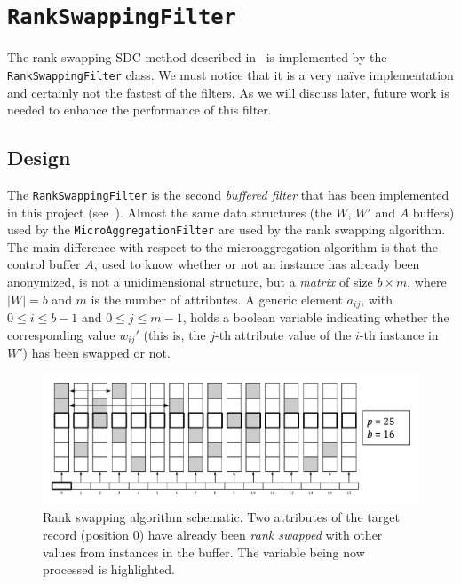 \section{\texttt{RankSwappingFilter}}
\label{Implementation:RankSwapping}

The rank swapping SDC method described in~ is implemented by the \texttt{RankSwappingFilter} class. We must notice that it is a very naïve implementation and certainly not the fastest of the filters. As we will discuss later, future work is needed to enhance the performance of this filter.

\subsection{Design}
\label{Implementation:RankSwapping:Design}

The \texttt{RankSwappingFilter} is the second \textit{buffered filter} that has been implemented in this project (see~). Almost the same data structures (the $W$, $W'$ and $A$ buffers) used by the \texttt{MicroAggregationFilter} are used by the rank swapping algorithm. The main difference with respect to the microaggregation algorithm is that the control buffer $A$, used to know whether or not an instance has already been anonymized, is not a unidimensional structure, but a \textit{matrix} of size $b \times m$, where $\vert W \vert = b$ and $m$ is the number of attributes. A generic element $a_{ij}$, with $0 \leq i \leq b-1$ and $0 \leq j \leq m-1$, holds a boolean variable indicating whether the corresponding value $w_{ij}'$ (this is, the $j$-th attribute value of the $i$-th instance in $W'$) has been swapped or not.

\begin{figure}
\centering
\includegraphics[width=1.0\linewidth]{figures/rank-swapping-schematic-1.pdf}
\caption[Rank swapping algorithm schematic.]{Rank swapping algorithm schematic. Two attributes of the target record (position 0) have already been \textit{rank swapped} with other values from instances in the buffer. The variable being now processed is highlighted.}
\end{figure}

